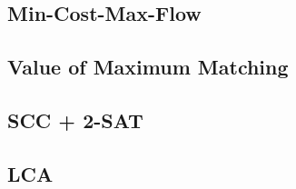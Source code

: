\subsection{Min-Cost-Max-Flow}


\subsection{Value of Maximum Matching}


%

%


%

\subsection{SCC + 2-SAT}


\subsection{LCA}

